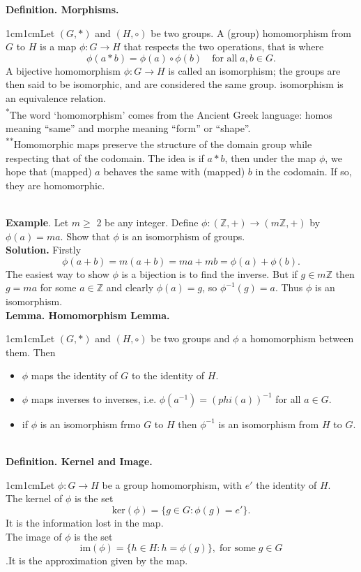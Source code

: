 \documentclass{article}
\newcommand{\definition}[2]{\textbf{Definition. #1.}\begin{adjustwidth}{1cm}{1cm}#2\end{adjustwidth}}
\newcommand{\lemma}[2]{\textbf{Lemma. #1.}\begin{adjustwidth}{1cm}{1cm}#2\end{adjustwidth}}
\begin{document}
\definition{Morphisms}{Let $(G, *)$ and $(H, \circ)$ be two groups. A (group) homomorphism from $G$ to $H$ is a map $\phi : G \rightarrow H$ that respects the two operations, that is where \[\phi(a * b) = \phi(a) \circ \phi(b) \quad \text{for all} \; a,b \in G.\]A bijective homomorphism $\phi: G \rightarrow H$ is called an isomorphism; the groups are then said to be isomorphic, and are considered the same group. isomorphism is an equivalence relation.\\[1\baselineskip]\textsuperscript{*}The word `homomorphism' comes from the Ancient Greek language: homos meaning ``same'' and morphe meaning ``form'' or ``shape''.\\[1\baselineskip]\textsuperscript{**}Homomorphic maps preserve the structure of the domain group while respecting that of the codomain. The idea is if $a * b$, then under the map $\phi$, we hope that (mapped) $a$ behaves the same with (mapped) $b$ in the codomain. If so, they are homomorphic.}~\\
\textbf{Example}. Let $m \geq$ 2 be any integer. Define $\phi: (\mathbb{Z},+) \rightarrow (m\mathbb{Z},+)$ by $\phi(a) = ma$. Show that $\phi$ is an isomorphism of groups.\\
\textbf{Solution.} Firstly \[\phi(a+b)=m(a+b)=ma+mb=\phi(a)+\phi(b).\]The easiest way to show $\phi$ is a bijection is to find the inverse. But if $g \in m\mathbb{Z}$ then $g=ma$ for some $a \in \mathbb{Z}$ and clearly $\phi(a) = g$, so $\phi^{-1}(g) = a$. Thus $\phi$ is an isomorphism.\\[1\baselineskip]
\lemma{Homomorphism Lemma}{Let $(G, *)$ and $(H, \circ)$ be two groups and $\phi$ a homomorphism between them. Then \begin{itemize}\item $\phi$ maps the identity of $G$ to the identity of $H$.\item $\phi$ maps inverses to inverses, i.e. $\phi(a^{-1})=(phi(a))^{-1}$ for all $a \in G$.\item if $\phi$ is an isomorphism frmo $G$ to $H$ then $\phi^{-1}$ is an isomorphism from $H$ to $G$.\end{itemize}}~\\
\definition{Kernel and Image}{Let $\phi : G \rightarrow H$ be a group homomorphism, with $e'$ the identity of $H$.\\The kernel of $\phi$ is the set \[\text{ker}(\phi) = \{g \in G: \phi(g) = e' \}.\]It is the information lost in the map.\\The image of $\phi$ is the set \[\text{im}(\phi) = \{h \in H : h = \phi(g)\}, \; \text{for some} \; g \in G\].It is the approximation given by the map.}~\\
\end{document}
